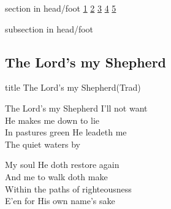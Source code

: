 \documentclass{beamer}
\begin{document}
{
{ 
 {
 \begin{beamercolorbox}[ht=4.5ex,dp=1.5ex,%
      leftskip=.3cm,rightskip=.3cm plus1fil]{section in head/foot}
 \fontsize{12}{25}\selectfont 
\hyperlink{The Lord's my Shepherd['Psalm 23'](Trad)1}{1}
\hyperlink{The Lord's my Shepherd['Psalm 23'](Trad)2}{2}
\hyperlink{The Lord's my Shepherd['Psalm 23'](Trad)3}{3}
\hyperlink{The Lord's my Shepherd['Psalm 23'](Trad)4}{4}
\hyperlink{The Lord's my Shepherd['Psalm 23'](Trad)5}{5}
 
 \end{beamercolorbox}%
  \begin{beamercolorbox}[ht=2.5ex,dp=1.125ex,%
   leftskip=.3cm,rightskip=.3cm plus1fil]{subsection in head/foot}
   \insertauthor
 \end{beamercolorbox}%
 }
}
\subsection{ The Lord's my Shepherd }

\hypertarget{The Lord's my Shepherd['Psalm 23'](Trad)}{}
\begin{frame}{}
 \vfill
  \centering
  \begin{beamercolorbox}[sep=8pt,center,shadow=true,rounded=true]{title}
    The Lord's my Shepherd(Trad)    
  \end{beamercolorbox}
  \vfill
\end{frame}

\hypertarget{The Lord's my Shepherd['Psalm 23'](Trad)1}{}
\begin{frame}{}
\fontsize{ 18 }{ 23 }\selectfont

The Lord's my Shepherd I'll not want\\ 
He makes me down to lie\\ 
In pastures green He leadeth me\\ 
The quiet waters by 

\end{frame}

\hypertarget{The Lord's my Shepherd['Psalm 23'](Trad)2}{}
\begin{frame}{}
\fontsize{ 18 }{ 23 }\selectfont

My soul He doth restore again\\ 
And me to walk doth make\\ 
Within the paths of righteousness\\ 
E'en for His own name's sake 


\end{frame}}
\end{document}
